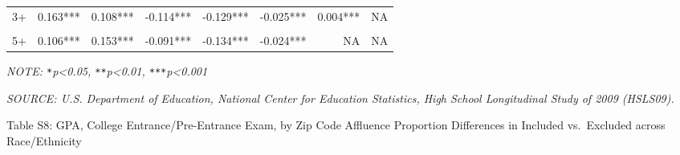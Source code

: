 \documentclass[
  12pt,
]{article}
\begin{document}
\begin{table}[!h]
{\begin{tabular}{lrrrrrrr}
\hspace{1em}3+ & 0.163*** & 0.108*** & -0.114*** & -0.129*** & -0.025*** & 0.004*** & NA\\
\cellcolor{gray!6}{\hspace{1em}4+} & \cellcolor{gray!6}{0.139***} & \cellcolor{gray!6}{0.119***} & \cellcolor{gray!6}{-0.105***} & \cellcolor{gray!6}{-0.129***} & \cellcolor{gray!6}{-0.026***} & \cellcolor{gray!6}{0.008***} & \cellcolor{gray!6}{NA}\\
\hspace{1em}5+ & 0.106*** & 0.153*** & -0.091*** & -0.134*** & -0.024*** & NA & NA\\
\bottomrule
\end{tabular}}
\endgroup{}
\end{table}
\begingroup
\fontsize{10}{10}\selectfont

\emph{NOTE: \texttt{*}p\textless0.05, \texttt{**}p\textless0.01, \texttt{***}p\textless0.001}

\emph{SOURCE: U.S. Department of Education, National Center for Education Statistics, High School Longitudinal Study of 2009 (HSLS09).}
\endgroup

\clearpage

Table S8: GPA, College Entrance/Pre-Entrance Exam, by Zip Code Affluence Proportion Differences in Included vs.~Excluded across Race/Ethnicity
\end{document}
